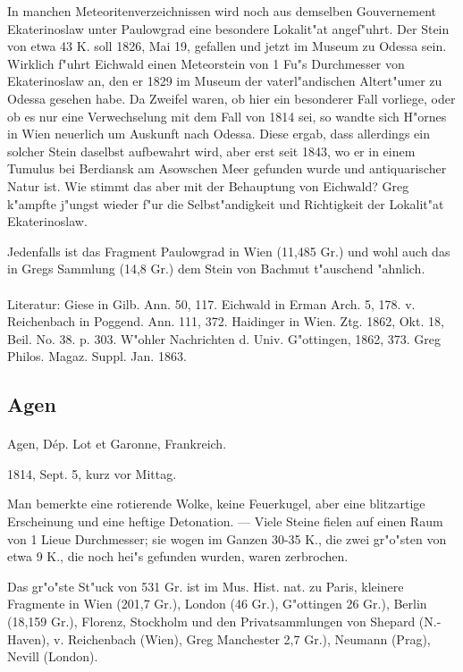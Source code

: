\documentclass[a4paper, 11pt, oneside]{article}
\begin{document}
In manchen Meteoritenverzeichnissen wird noch aus demselben Gouvernement Ekaterinoslaw unter Paulowgrad eine besondere Lokalit"at angef"uhrt. Der Stein von etwa 43 K. soll 1826, Mai 19, gefallen und jetzt im Museum zu Odessa sein. Wirklich f"uhrt Eichwald einen Meteorstein von 1 Fu"s Durchmesser von Ekaterinoslaw an, den er 1829 im Museum der vaterl"andischen Altert"umer zu Odessa gesehen habe. Da Zweifel waren, ob hier ein besonderer Fall vorliege, oder ob es nur eine Verwechselung mit dem Fall von 1814 sei, so wandte sich H"ornes in Wien neuerlich um Auskunft nach Odessa. Diese ergab, dass allerdings ein solcher Stein daselbst aufbewahrt wird, aber erst seit 1843, wo er in einem Tumulus bei Berdiansk am Asowschen Meer gefunden wurde und antiquarischer Natur ist. Wie stimmt das aber mit der Behauptung von Eichwald? Greg k"ampfte j"ungst wieder f"ur die Selbst"andigkeit und Richtigkeit der Lokalit"at Ekaterinoslaw.

Jedenfalls ist das Fragment Paulowgrad in Wien (11,485 Gr.) und wohl auch das in Gregs Sammlung (14,8 Gr.) dem Stein von Bachmut t"auschend "ahnlich.
\footnotesize
\paragraph{}
Literatur: Giese in Gilb. Ann. 50, 117. Eichwald in Erman Arch. 5, 178. v. Reichenbach in Poggend. Ann. 111, 372. Haidinger in Wien. Ztg. 1862, Okt. 18, Beil. No. 38. p. 303. W"ohler Nachrichten d. Univ. G"ottingen, 1862, 373. Greg Philos. Magaz. Suppl. Jan. 1863.
\subsection{Agen}
\normalsize
\paragraph{}
Agen, Dép. Lot et Garonne, Frankreich.

1814, Sept. 5, kurz vor Mittag.

Man bemerkte eine rotierende Wolke, keine Feuerkugel, aber eine blitzartige Erscheinung und eine heftige Detonation. --- Viele Steine fielen auf einen Raum von 1 Lieue Durchmesser; sie wogen im Ganzen 30-35 K., die zwei gr"o"sten von etwa 9 K., die noch hei"s gefunden wurden, waren zerbrochen.

Das gr"o"ste St"uck von 531 Gr. ist im Mus. Hist. nat. zu Paris, kleinere Fragmente in Wien (201,7 Gr.), London (46 Gr.), G"ottingen 26 Gr.), Berlin (18,159 Gr.), Florenz, Stockholm und den Privatsammlungen von Shepard (N.-Haven), v. Reichenbach (Wien), Greg Manchester 2,7 Gr.), Neumann (Prag), Nevill (London).
\end{document}
